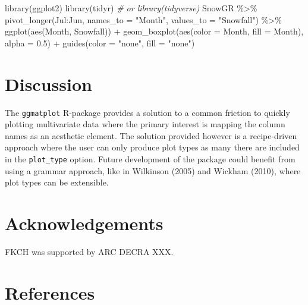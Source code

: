 \documentclass[10pt,a4paper,onecolumn]{article}
\newenvironment{Shaded}{\begin{snugshade}}{\end{snugshade}}
\newcommand{\AttributeTok}[1]{\textcolor[rgb]{0.77,0.63,0.00}{#1}}
\newcommand{\CommentTok}[1]{\textcolor[rgb]{0.56,0.35,0.01}{\textit{#1}}}
\newcommand{\FloatTok}[1]{\textcolor[rgb]{0.00,0.00,0.81}{#1}}
\newcommand{\FunctionTok}[1]{\textcolor[rgb]{0.00,0.00,0.00}{#1}}
\newcommand{\NormalTok}[1]{#1}
\newcommand{\SpecialCharTok}[1]{\textcolor[rgb]{0.00,0.00,0.00}{#1}}
\newcommand{\StringTok}[1]{\textcolor[rgb]{0.31,0.60,0.02}{#1}}
\begin{document}
\begin{Shaded}
\begin{Highlighting}[]
\FunctionTok{library}\NormalTok{(ggplot2)}
\FunctionTok{library}\NormalTok{(tidyr) }\CommentTok{\# or library(tidyverse)}
\NormalTok{SnowGR }\SpecialCharTok{\%\textgreater{}\%} 
  \FunctionTok{pivot\_longer}\NormalTok{(Jul}\SpecialCharTok{:}\NormalTok{Jun, }
               \AttributeTok{names\_to =} \StringTok{"Month"}\NormalTok{,}
               \AttributeTok{values\_to =} \StringTok{"Snowfall"}\NormalTok{) }\SpecialCharTok{\%\textgreater{}\%} 
  \FunctionTok{ggplot}\NormalTok{(}\FunctionTok{aes}\NormalTok{(Month, Snowfall)) }\SpecialCharTok{+} 
  \FunctionTok{geom\_boxplot}\NormalTok{(}\FunctionTok{aes}\NormalTok{(}\AttributeTok{color =}\NormalTok{ Month, }\AttributeTok{fill =}\NormalTok{ Month), }\AttributeTok{alpha =} \FloatTok{0.5}\NormalTok{) }\SpecialCharTok{+}
  \FunctionTok{guides}\NormalTok{(}\AttributeTok{color =} \StringTok{"none"}\NormalTok{, }\AttributeTok{fill =} \StringTok{"none"}\NormalTok{)}
\end{Highlighting}
\end{Shaded}

\hypertarget{discussion}{%
\section{Discussion}\label{discussion}}

The \texttt{ggmatplot} R-package provides a solution to a common
friction to quickly plotting multivariate data where the primary
interest is mapping the column names as an aesthetic element. The
solution provided however is a recipe-driven approach where the user can
only produce plot types as many there are included in the
\texttt{plot\_type} option. Future development of the package could
benefit from using a grammar approach, like in Wilkinson (2005) and
Wickham (2010), where plot types can be extensible.

\hypertarget{acknowledgements}{%
\section{Acknowledgements}\label{acknowledgements}}

FKCH was supported by ARC DECRA XXX.

\hypertarget{references}{%
\section*{References}\label{references}}
\end{document}
